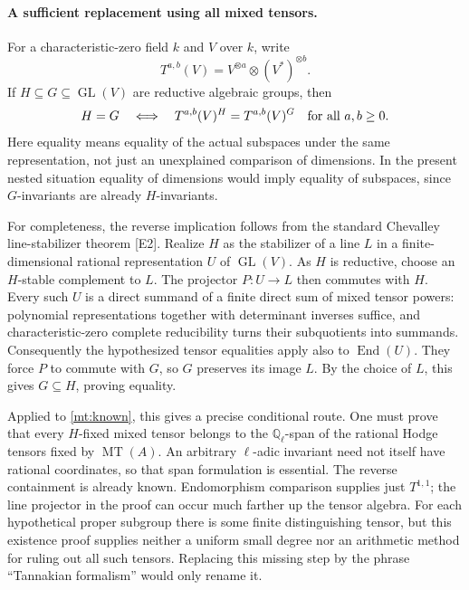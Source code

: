 \documentclass[11pt]{article}
\begin{document}
\paragraph{A sufficient replacement using all mixed tensors.}
For a characteristic-zero field $k$ and $V$ over $k$, write
\[
 T^{a,b}(V)=V^{\otimes a}\otimes(V^*)^{\otimes b}.
\]
If $H\subseteq G\subseteq\operatorname{GL}(V)$ are reductive algebraic
groups, then
\begin{equation}\label{mt:tensors}
 H=G\quad\Longleftrightarrow\quad
 T^{a,b}(V)^H=T^{a,b}(V)^G\quad\hbox{for all }a,b\geq0.
\end{equation}
Here equality means equality of the actual subspaces under the same
representation, not just an unexplained comparison of dimensions.
In the present nested situation equality of dimensions would imply
equality of subspaces, since $G$-invariants are already $H$-invariants.

For completeness, the reverse implication follows from the standard
Chevalley line-stabilizer theorem [E2]. Realize $H$ as the stabilizer
of a line $L$ in a finite-dimensional rational representation $U$ of
$\operatorname{GL}(V)$. As $H$ is reductive, choose an $H$-stable
complement to $L$. The projector $P:U\to L$ then commutes with $H$.
Every such $U$ is a direct summand of a finite direct sum of mixed
tensor powers: polynomial representations together with determinant
inverses suffice, and characteristic-zero complete reducibility
turns their subquotients into summands. Consequently the hypothesized
tensor equalities apply also to $\operatorname{End}(U)$. They force
$P$ to commute with $G$, so $G$ preserves its image $L$. By the choice
of $L$, this gives $G\subseteq H$, proving equality.

Applied to \eqref{mt:known}, this gives a precise conditional route.
One must prove that every $H$-fixed mixed tensor belongs to the
$\mathbb Q_\ell$-span of the rational Hodge tensors fixed by
$\operatorname{MT}(A)$. An arbitrary $\ell$-adic invariant need not
itself have rational coordinates, so that span formulation is
essential. The reverse containment is already known. Endomorphism
comparison supplies just $T^{1,1}$; the line projector in the proof
can occur much farther up the tensor algebra. For each hypothetical
proper subgroup there is some finite distinguishing tensor, but this
existence proof supplies neither a uniform small degree nor an
arithmetic method for ruling out all such tensors. Replacing this
missing step by the phrase ``Tannakian formalism'' would only rename it.
\end{document}

